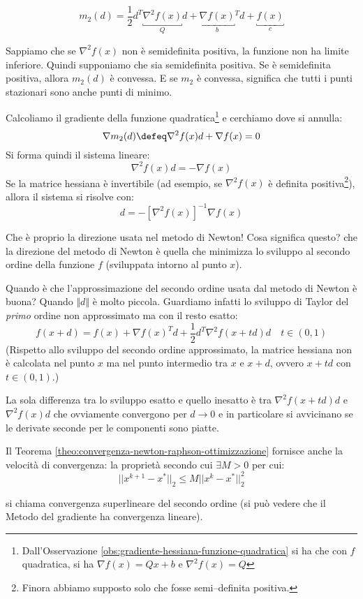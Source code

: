 $$ m_2(d) = \frac{1}{2} d^{T} \underbracket{\nabla^2 f(x)}_{Q}d + \underbracket{\nabla f(x)}_{b} {^T} d + \underbracket{f(x)}_{c}$$

Sappiamo che se $\nabla^2 f(x)$ non \`e semidefinita positiva, la
funzione non ha limite inferiore. Quindi supponiamo che sia
semidefinita positiva. Se \`e semidefinita positiva, allora $m_2(d)$ \`e
convessa. E se $m_2$ \`e convessa, significa che tutti i punti
stazionari sono anche punti di minimo.

Calcoliamo il gradiente della funzione
quadratica\footnote{Dall'Osservazione
\ref{obs:gradiente-hessiana-funzione-quadratica} si ha che con $f$
quadratica, si ha $\nabla f(x) = Qx + b$ e $\nabla^2 f(x) = Q$} e
cerchiamo dove si annulla:
$$ \nabla m_2(d) \defeq \nabla^{2} f(x) d + \nabla f(x)=0$$
Si forma quindi il sistema lineare:
$$ \nabla^{2} f(x) d = - \nabla f(x)$$
Se la matrice hessiana \`e invertibile (ad esempio, se $\nabla^{2} f(x)$
\`e definita positiva\footnote{Finora abbiamo supposto solo che fosse
semi--definita positiva.}), allora il sistema si risolve con:
$$ d = - [\nabla^2f(x) ]^{-1} \nabla f(x)$$

Che \`e proprio la direzione usata nel metodo di Newton! Cosa significa
questo? che la direzione del metodo di Newton \`e quella che minimizza
lo sviluppo al secondo ordine della funzione $f$ (sviluppata intorno
al punto $x$).

\begin{observation} Quando \`e che l'approssimazione del secondo ordine
usata dal metodo di Newton \`e buona? Quando $\Vert d \Vert$ \`e molto
piccola. Guardiamo infatti lo sviluppo di Taylor del \emph{primo}
ordine non approssimato ma con il resto esatto:
$$ f(x+d) = f(x) + \nabla f(x)^{T}d+ \frac{1}{2} d^{T} \nabla^{2} f(x+td)d
\quad t\in(0,1)$$ (Rispetto allo sviluppo del secondo ordine
approssimato, la matrice hessiana non \`e calcolata nel punto $x$ ma nel
punto intermedio tra $x$ e $x+d$, ovvero $x+td$ con $t\in(0,1)$.)

La sola differenza tra lo sviluppo esatto e quello inesatto \`e tra
$\nabla^{2} f(x+td)d$ e $\nabla^{2} f(x)d$ che ovviamente convergono
per $d \to 0$ e in particolare si avvicinano se le derivate seconde
per le componenti sono piatte.
\end{observation}

\begin{observation} Il Teorema
\ref{theo:convergenza-newton-raphson-ottimizzazione} fornisce anche la
velocit\`a di convergenza: la propriet\`a secondo cui $\exists M > 0 $ per
cui:
$$|| x^{k+1} -x^{*}||_{2} \leq M ||x^{k} - x^{*}||_{2}^{2}$$

si chiama convergenza superlineare del secondo ordine (si può vedere
che il Metodo del gradiente ha convergenza lineare).
\end{observation}

